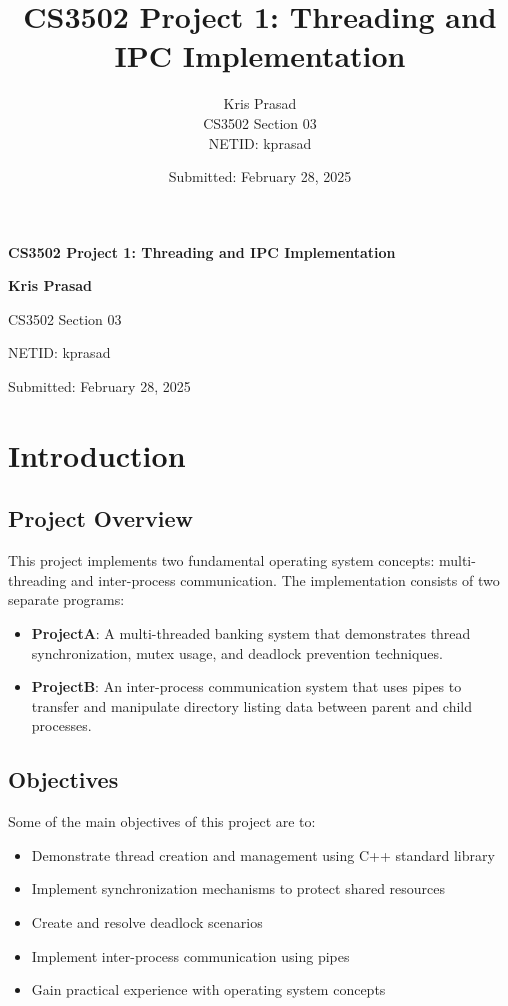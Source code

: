 \documentclass[12pt]{article}
\title{CS3502 Project 1: Threading and IPC Implementation}
\author{Kris Prasad \\[0.5em]
CS3502 Section 03 \\[0.5em]
NETID: kprasad\\[0.5em]
}
\date{Submitted: February 28, 2025}
\begin{document}
\begin{titlepage}
    \centering
    \vspace*{2cm}
    
    {\LARGE\bfseries CS3502 Project 1: Threading and IPC Implementation\par}
    \vspace{2cm}
    
    {\large\bfseries Kris Prasad\par}
    \vspace{0.5cm}
    {\large CS3502 Section 03\par}
    \vspace{0.5cm}
    {\large NETID: kprasad\par}
    \vspace{2cm}
    
    {\large Submitted: February 28, 2025\par}
    
    \vfill
\end{titlepage}

\newpage

\section{Introduction}
\subsection{Project Overview}
This project implements two fundamental operating system concepts: multi-threading and inter-process communication. The implementation consists of two separate programs:

\begin{itemize}
    \item \textbf{ProjectA}: A multi-threaded banking system that demonstrates thread synchronization, mutex usage, and deadlock prevention techniques.
    \item \textbf{ProjectB}: An inter-process communication system that uses pipes to transfer and manipulate directory listing data between parent and child processes.
\end{itemize}

\subsection{Objectives}
Some of the main objectives of this project are to:
\begin{itemize}
    \item Demonstrate thread creation and management using C++ standard library
    \item Implement synchronization mechanisms to protect shared resources
    \item Create and resolve deadlock scenarios
    \item Implement inter-process communication using pipes
    \item Gain practical experience with operating system concepts
\end{itemize}
\end{document}
